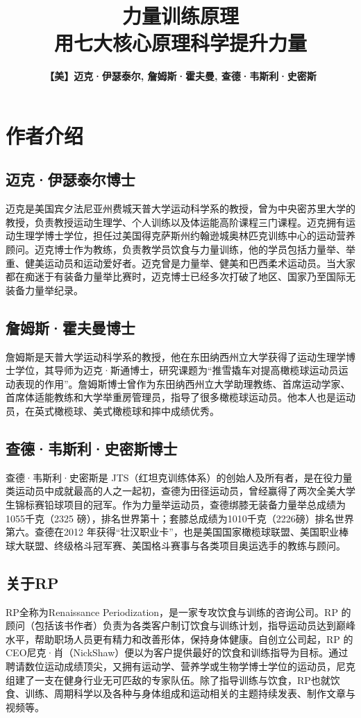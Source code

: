 \documentclass[fontset=fandol, a4paper, 12pt, openright]{ctexbook}
\title{\Huge \textbf{力量训练原理}\\\Large 用七大核心原理科学提升力量}
\author{\textbf{【美】迈克·伊瑟泰尔, 詹姆斯·霍夫曼, 查德·韦斯利·史密斯}}
\date{}
\begin{document}
\frontmatter

\maketitle

\chapter*{作者介绍}

\section*{迈克·伊瑟泰尔博士}
迈克是美国宾夕法尼亚州费城天普大学运动科学系的教授，曾为中央密苏里大学的教授，负责教授运动生理学、个人训练以及体运能高阶课程三门课程。迈克拥有运动生理学博士学位，担任过美国得克萨斯州约翰逊城奥林匹克训练中心的运动营养顾问。迈克博士作为教练，负责教学员饮食与力量训练，他的学员包括力量举、举重、健美运动员和运动爱好者。迈克曾是力量举、健美和巴西柔术运动员。当大家都在痴迷于有装备力量举比赛时，迈克博士已经多次打破了地区、国家乃至国际无装备力量举纪录。

\section*{詹姆斯·霍夫曼博士}
詹姆斯是天普大学运动科学系的教授，他在东田纳西州立大学获得了运动生理学博士学位，其导师为迈克·斯通博士，研究课题为“推雪撬车对提高橄榄球运动员运动表现的作用”。詹姆斯博士曾作为东田纳西州立大学助理教练、首席运动学家、首席体适能教练和大学举重房管理员，指导了很多橄榄球运动员。他本人也是运动员，在英式橄榄球、美式橄榄球和摔中成绩优秀。

\section*{查德·韦斯利·史密斯博士}
查德·韦斯利·史密斯是 JTS（红坦克训练体系）的创始人及所有者，是在役力量类运动员中成就最高的人之一起初，查德为田径运动员，曾经赢得了两次全美大学生锦标赛铅球项目的冠军。作为力量举运动员，查德绑膝无装备力量举总成绩为1055千克（2325 磅），排名世界第十；套膝总成绩为1010千克（2226磅）排名世界第六。查德在2012 年获得“壮汉职业卡”，也是美国国家橄榄球联盟、美国职业棒球大联盟、终级格斗冠军赛、美国格斗赛事与各类项目奥运选手的教练与顾问。

\section*{关于RP}
RP全称为Renaissance Periodization，是一家专攻饮食与训练的咨询公司。RP 的顾问（包括该书作者）负责为各类客户制订饮食与训练计划，指导运动员达到巅峰水平，帮助职场人员更有精力和改善形体，保持身体健康。自创立公司起，RP 的CEO尼克·肖（NickShaw）便以为客户提供最好的饮食和训练指导为目标。通过聘请数位运动成绩顶尖，又拥有运动学、营养学或生物学博士学位的运动员，尼克组建了一支在健身行业无可匹敌的专家队伍。除了指导训练与饮食，RP也就饮食、训练、周期科学以及各种与身体组成和运动相关的主题持续发表、制作文章与视频等。
\end{document}
